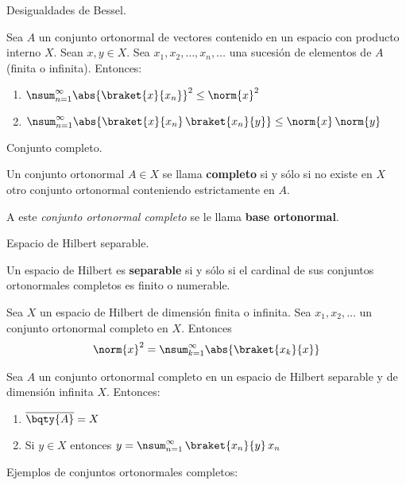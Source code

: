 \begin{teo} Desigualdades de Bessel.
    
Sea $A$ un conjunto ortonormal de vectores contenido en un espacio con producto interno $X$. Sean $x, y \in X$. Sea ${x_{1}, x_{2}, \ldots, x_{n}, \ldots}$ una sucesión de elementos de $A$ (finita o infinita). Entonces:
\begin{enumerate}[label=\roman*.]
\item $\displaystyle{\nsum_{n=1}^{\infty} \abs{\braket{x}{x_{n}}}^{2} \leq \norm{x}^{2}}$
\item $\displaystyle{\nsum_{n=1}^{\infty} \abs{\braket{x}{x_{n}} \, \braket{x_{n}}{y}} \leq \norm{x} \, \norm{y}}$
\end{enumerate}
\end{teo}

\begin{defi} Conjunto completo.

Un conjunto ortonormal $A \in X$ se llama \textbf{completo} si y sólo si no existe en $X$ otro conjunto ortonormal conteniendo estrictamente en $A$.

A este \textit{conjunto ortonormal completo} se le llama \textbf{base ortonormal}.
\end{defi}
\begin{defi} Espacio de Hilbert separable.

Un espacio de Hilbert es \textbf{separable} si y sólo si el cardinal de sus conjuntos ortonormales completos es finito o numerable.
\end{defi}
\begin{teo}
Sea $X$ un espacio de Hilbert de dimensión finita o infinita. Sea ${x_{1}, x_{2}, \ldots}$ un conjunto ortonormal completo en $X$. Entonces
\begin{align*} \norm{x}^{2} = \nsum_{k=1}^{\infty} \abs{\braket{x_{k}}{x}} \end{align*}
\end{teo}
\begin{teo}
 Sea $A$ un conjunto ortonormal completo en un espacio de Hilbert separable y de dimensión infinita $X$. Entonces:
 \begin{enumerate}[label=\roman*.]
\item $\overline{\bqty{A}} = X$
\item Si $y \in X$ entonces $\displaystyle{y = \nsum_{n=1}^{\infty} \, \braket{x_{n}}{y} \, x_{n}}$
 \end{enumerate}
\end{teo}
Ejemplos de conjuntos ortonormales completos:
